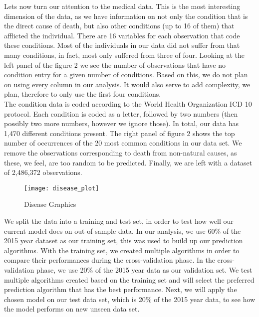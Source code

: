 \documentclass{article}
\begin{document}
Lets now turn our attention to the medical data. This is the most interesting dimension of the data, as we have information on not only the condition that is the direct cause of death, but also other conditions (up to 16 of them) that afflicted the individual. There are 16 variables for each observation that code these conditions. Most of the individuals in our data did not suffer from that many conditions, in fact, most only suffered from three of four. Looking at the left panel of the figure 2 we see the number of observations that have no condition entry for a given number of conditions. Based on this, we do not plan on using every column in our analysis. It would also serve to add complexity, we plan, therefore to only use the first four conditions. \\

The condition data is coded according to the World Health Organization ICD 10 protocol. Each condition is coded as a letter, followed by two numbers (then possibly two more numbers, however we ignore those). In total, our data has 1,470 different conditions present. The right panel of figure 2 shows the top number of occurrences of the 20 most common conditions in our data set. We remove the observations corresponding to death from non-natural causes, as these, we feel, are too random to be predicted. Finally, we are left with a dataset of 2,486,372 observations.\\

\begin{figure}\label{disease}
\centering
\caption{Disease Graphics}
\texttt{[image: disease\_plot]}
\end{figure}



We split the data into a training and test set, in order to test how well our current model does on out-of-sample data. 
In our analysis, we use 60\% of the 2015 year dataset as our training set, this was used to build up our prediction algorithms. With the training set, we created multiple algorithms in order to compare their performances during the cross-validation phase. In the cross-validation phase, we use 20\% of the 2015 year data as our validation set. We test multiple algorithms created based on the training set and will select the preferred prediction algorithm that has the best performance. Next, we will apply the chosen model on our test data set, which is 20\% of the 2015 year data, to see how the model performs on new unseen data set.\\
\end{document}
